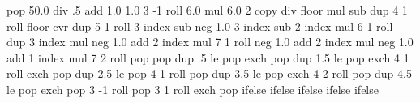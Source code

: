 
  {\pgfpoint{0bp}{0bp}}
  {\pgfpoint{100bp}{100bp}}{}{
  pop 50.0 div %
  .5 add %
  1.0 1.0 %
  3 -1 roll %
  6.0 mul %
  6.0 2 copy div floor mul sub %
  dup 4 1 roll %
  floor cvr %
  dup 5 1 roll %
  3 index sub neg %
  1.0 3 index sub %
  2 index mul %
  6 1 roll %
  dup 3 index mul neg 1.0 add %
  2 index mul %
  7 1 roll %
  neg 1.0 add %
  2 index mul neg 1.0 add %
  1 index mul %
  7 2 roll %
  pop pop %
  dup .5 le %
  {
    pop exch pop
  }
  { dup 1.5 le %
    {
      pop exch 4 1 roll exch pop
    }
    { dup 2.5 le %
      {
        pop 4 1 roll pop
      }
      { dup 3.5 le %
        {
          pop exch 4 2 roll pop
        }
        { dup 4.5 le %
          {
            pop exch pop 3 -1 roll
          }
          {
            pop 3 1 roll exch pop
          }
          ifelse
        }
        ifelse %
      }
      ifelse %
    }
    ifelse %
  }
  ifelse %
}

